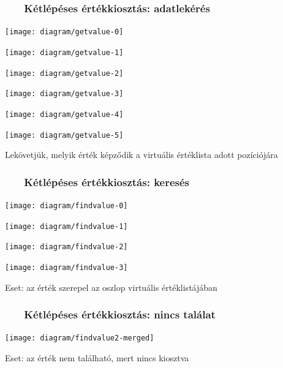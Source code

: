 \documentclass[
    aspectratio=169,
]{beamer}
\newcommand{\slidetitle}[2]{\frametitle{{\small #1 ~ \ding{226} ~ } \normalsize \textbf{#2} }}
\begin{document}
\begin{frame}
    \slidetitle{\sectionshorttitle}{Kétlépéses értékkiosztás: adatlekérés}
    
    \centering
    
    \begin{overprint}
        \centerline{\texttt{[image: diagram/getvalue-0]}}
        \centerline{\texttt{[image: diagram/getvalue-1]}}
        \centerline{\texttt{[image: diagram/getvalue-2]}}
        \centerline{\texttt{[image: diagram/getvalue-3]}}
        \centerline{\texttt{[image: diagram/getvalue-4]}}
        \centerline{\texttt{[image: diagram/getvalue-5]}}
    \end{overprint}
    
    \hspace{0.7cm}
    
    Lekövetjük, melyik érték képződik a virtuális értéklista adott pozíciójára
\end{frame}

\begin{frame}
    \slidetitle{\sectionshorttitle}{Kétlépéses értékkiosztás: keresés}
    
    \centering
    
    \begin{overprint}
        \centerline{\texttt{[image: diagram/findvalue-0]}}
        \centerline{\texttt{[image: diagram/findvalue-1]}}
        \centerline{\texttt{[image: diagram/findvalue-2]}}
        \centerline{\texttt{[image: diagram/findvalue-3]}}
    \end{overprint}
    
    \vspace{0.7cm}
    
    Eset: az érték szerepel az oszlop virtuális értéklistájában
\end{frame}

\begin{frame}
    \slidetitle{\sectionshorttitle}{Kétlépéses értékkiosztás: nincs találat}
    
    \centering
    
    \texttt{[image: diagram/findvalue2-merged]}
    
    \vspace{0.7cm}
    
    Eset: az érték nem található, mert nincs kiosztva
\end{frame}
\end{document}
